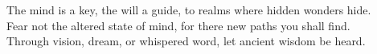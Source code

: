 \documentclass{article}
\begin{document}
\begin{infobox}
The mind is a key, the will a guide, to realms where hidden wonders hide.\\
Fear not the altered state of mind, for there new paths you shall find.\\
Through vision, dream, or whispered word, let ancient wisdom be heard.
\end{infobox}
\end{document}
